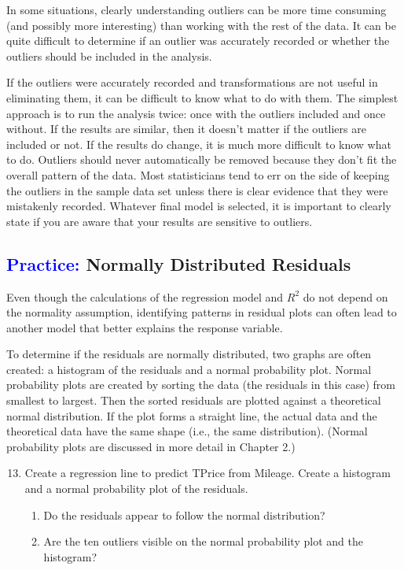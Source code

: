 \documentclass[
]{report}
\begin{document}
In some situations, clearly understanding outliers can be more time consuming (and possibly more interesting) than working with the rest of the data. It can be quite difficult to determine if an outlier was accurately recorded or whether the outliers should be included in the analysis.

If the outliers were accurately recorded and transformations are not useful in eliminating them, it can be difficult to know what to do with them. The simplest approach is to run the analysis twice: once with the outliers included and once without. If the results are similar, then it doesn't matter if the outliers are included or not. If the results do change, it is much more difficult to know what to do. Outliers should never automatically be removed because they don't fit the overall pattern of the data. Most statisticians tend to err on the side of keeping the outliers in the sample data set unless there is clear evidence that they were mistakenly recorded. Whatever final model is selected, it is important to clearly state if you are aware that your results are sensitive to outliers.

\hypertarget{normally-distributed-residuals}{%
\subsection*{\texorpdfstring{\textcolor{blue}{Practice:} Normally Distributed Residuals}{ Normally Distributed Residuals}}\label{normally-distributed-residuals}}

Even though the calculations of the regression model and \(\scriptstyle {R}^2\) do not depend on the normality assumption, identifying patterns in residual plots can often lead to another model that better explains the response variable.

To determine if the residuals are normally distributed, two graphs are often created: a histogram of the residuals and a normal probability plot. Normal probability plots are created by sorting the data (the residuals in this case) from smallest to largest. Then the sorted residuals are plotted against a theoretical normal distribution. If the plot forms a straight line, the actual data and the theoretical data have the same shape (i.e., the same distribution). (Normal probability plots are discussed in more detail in
Chapter 2.)

\begin{enumerate}
 \setcounter{enumi}{12}
 \item Create a regression line to predict TPrice from Mileage. Create a histogram and a normal probability plot of the residuals.
\begin{enumerate}
  \item Do the residuals appear to follow the normal distribution?
  \item  Are the ten outliers visible on the normal probability plot and the histogram?
\end{enumerate}
\end{enumerate}
\end{document}
